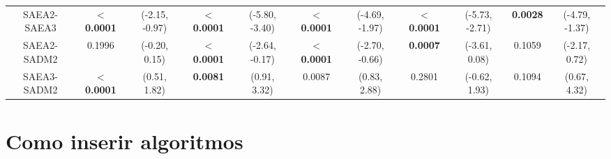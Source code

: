 \begin{landscape}
\begin{table}[]
\begin{tabular}{ccccccccccc}
					SAEA2-SAEA3             & $\boldsymbol{<}$\textbf{0.0001} & (-2.15, -0.97) & $\boldsymbol{<}$\textbf{0.0001} & (-5.80, -3.40) & $\boldsymbol{<}$\textbf{0.0001} & (-4.69, -1.97) & $\boldsymbol{<}$\textbf{0.0001} & (-5.73, -2.71) & \textbf{0.0028} &(-4.79, -1.37)                                        \\\rowcolor{gray1}
					SAEA2-SADM2             & 0.1996                     & (-0.20, 0.15)  & $\boldsymbol{<}$\textbf{0.0001} & (-2.64, -0.17)  & $\boldsymbol{<}$\textbf{0.0001} & (-2.70, -0.66) & \textbf{0.0007}       & (-3.61, 0.08)   & 0.1059             & (-2.17, 0.72)                                        \\\rowcolor{gray2}
					SAEA3-SADM2             & $\boldsymbol{<}$\textbf{0.0001} & (0.51, 1.82)    & \textbf{0.0081}        & (0.91, 3.32)     & 0.0087                       & (0.83, 2.88)   & 0.2801                    & (-0.62, 1.93)   & 0.1094             & (0.67, 4.32)                                                         
				\end{tabular}
				\label{tab:results:benchmark:zetas:pvalues}
			\end{table}
		\end{landscape}
	
	\chapter{Como inserir algoritmos}

